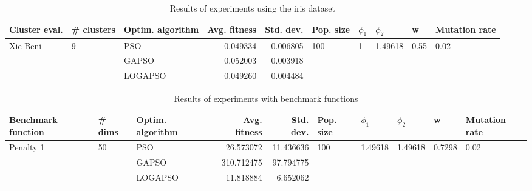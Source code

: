 \documentclass{article}
\begin{document}
\begin{table}
\centering
\caption{Results of experiments using the iris dataset}
\begin{tabular}{lllrrlllll}
\toprule
            Cluster eval. &        \# clusters & Optim. algorithm &  Avg. fitness &  Std. dev. &            Pop. size &         $\phi_{1}$ &               $\phi_{2}$ &                     w &         Mutation rate \\
\midrule
\multirow{3}{*}{Xie Beni} & \multirow{3}{*}{9} &              PSO &      0.049334 &   0.006805 & \multirow{3}{*}{100} & \multirow{3}{*}{1} & \multirow{3}{*}{1.49618} & \multirow{3}{*}{0.55} & \multirow{3}{*}{0.02} \\
                          &                    &            GAPSO &      0.052003 &   0.003918 &                      &                    &                          &                       &                       \\
                          &                    &          LOGAPSO &      0.049260 &   0.004484 &                      &                    &                          &                       &                       \\
\bottomrule
\end{tabular}
\end{table}
\begin{table}
\centering
\caption{Results of experiments with benchmark functions}
\begin{tabular}{lllrrlllll}
\toprule
        Benchmark function &             \# dims & Optim. algorithm &  Avg. fitness &  Std. dev. &            Pop. size &               $\phi_{1}$ &               $\phi_{2}$ &                       w &         Mutation rate \\
\midrule
\multirow{3}{*}{Penalty 1} & \multirow{3}{*}{50} &              PSO &     26.573072 &  11.436636 & \multirow{3}{*}{100} & \multirow{3}{*}{1.49618} & \multirow{3}{*}{1.49618} & \multirow{3}{*}{0.7298} & \multirow{3}{*}{0.02} \\
                           &                     &            GAPSO &    310.712475 &  97.794775 &                      &                          &                          &                         &                       \\
                           &                     &          LOGAPSO &     11.818884 &   6.652062 &                      &                          &                          &                         &                       \\
\bottomrule
\end{tabular}
\end{table}
\end{document}
